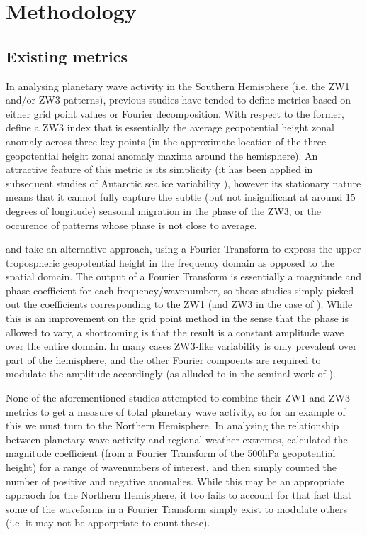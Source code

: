 \section{Methodology}\label{s:methodology}

\subsection{Existing metrics}\label{s:existing_metrics}

In analysing planetary wave activity in the Southern Hemisphere (i.e. the ZW1 and/or ZW3 patterns), previous studies have tended to define metrics based on either grid point values or Fourier decomposition. With respect to the former, \citet{Raphael2004} define a ZW3 index that is essentially the average geopotential height zonal anomaly across three key points (in the approximate location of the three geopotential height zonal anomaly maxima around the hemisphere). An attractive feature of this metric is its simplicity (it has been applied in subsequent studies of Antarctic sea ice variability \citep{Raphael2007,Raphael2014}), however its stationary nature means that it cannot fully capture the subtle (but not insignificant at around 15 degrees of longitude) seasonal migration in the phase of the ZW3, or the occurence of patterns whose phase is not close to average.

\citet{Hobbs2007} and \citet{Hobbs2010} take an alternative approach, using a Fourier Transform to express the upper tropospheric geopotential height in the frequency domain as opposed to the spatial domain. The output of a Fourier Transform is essentially a magnitude and phase coefficient for each frequency/wavenumber, so those studies simply picked out the coefficients corresponding to the ZW1 (and ZW3 in the case of \citet{Hobbs2010}). While this is an improvement on the grid point method in the sense that the phase is allowed to vary, a shortcoming is that the result is a constant amplitude wave over the entire domain. In many cases ZW3-like variability is only prevalent over part of the hemisphere, and the other Fourier compoents are required to modulate the amplitude accordingly (as alluded to in the seminal work of \citet{vanLoon1972}).

None of the aforementioned studies attempted to combine their ZW1 and ZW3 metrics to get a measure of total planetary wave activity, so for an example of this we must turn to the Northern Hemisphere. In analysing the relationship between planetary wave activity and regional weather extremes, \citet{Screen2014} calculated the magnitude coefficient (from a Fourier Transform of the 500hPa geopotential height) for a range of wavenumbers of interest, and then simply counted the number of positive and negative anomalies. While this may be an appropriate appraoch for the Northern Hemisphere, it too fails to account for that fact that some of the waveforms in a Fourier Transform simply exist to modulate others (i.e. it may not be apporpriate to count these).  